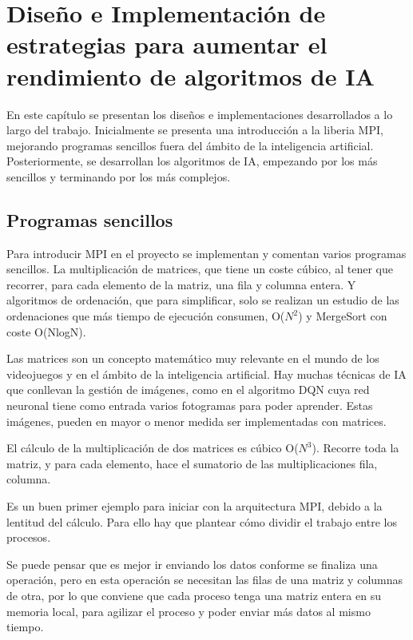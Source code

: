 

\chapter{Diseño e Implementación de estrategias para aumentar el rendimiento de algoritmos de IA}
\label{cap:c3_implementaciones}	


	
	En este capítulo se presentan los diseños e implementaciones desarrollados a lo largo del trabajo. Inicialmente se presenta una introducción a la liberia MPI, mejorando programas sencillos fuera del ámbito de la inteligencia artificial. Posteriormente, se desarrollan los algoritmos de IA, empezando por los más sencillos y terminando por los más complejos.

\section{Programas sencillos}

	Para introducir MPI en el proyecto se implementan y comentan varios programas sencillos. La multiplicación de matrices, que tiene un coste cúbico, al tener que recorrer, para cada elemento de la matriz, una fila y columna entera. Y algoritmos de ordenación, que para simplificar, solo se realizan un estudio de las ordenaciones que más tiempo de ejecución consumen, O(\(N^{2}\)) y MergeSort con coste O(NlogN).


	Las matrices son un concepto matemático muy relevante en el mundo de los videojuegos y en el ámbito de la inteligencia artificial. Hay muchas técnicas de IA que conllevan la gestión de imágenes, como en el algoritmo DQN cuya red neuronal tiene como entrada varios fotogramas para poder aprender. Estas imágenes, pueden en mayor o menor medida ser implementadas con matrices.
	
	El cálculo de la multiplicación de dos matrices es cúbico O(\(N^{3}\)). Recorre toda la matriz, y para cada elemento, hace el sumatorio de las multiplicaciones fila, columna. 
	
	Es un buen primer ejemplo para iniciar con la arquitectura MPI, debido a la lentitud del cálculo. Para ello hay que plantear cómo dividir el trabajo entre los procesos. 
	
	Se puede pensar que es mejor ir enviando los datos conforme se finaliza una operación, pero en esta operación se necesitan las filas de una matriz y columnas de otra, por lo que conviene que cada proceso tenga una matriz entera en su memoria local, para agilizar el proceso y poder enviar más datos al mismo tiempo.


